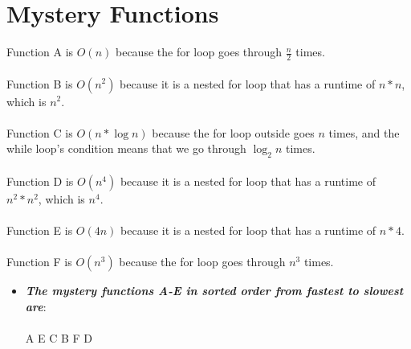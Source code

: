 \documentclass{article}
\begin{document}
    \vspace{1cm}
    \section{Mystery Functions}

    Function A is $O(n)$ because the for loop goes through $\frac{n}{2}$ times. \\ \\
    Function B is $O(n^2)$ because it is a nested for loop that has a runtime of $n*n$, which is $n^2$. \\ \\
    Function C is $O(n* \log n)$ because the for loop outside goes $n$ times, and the while loop's condition means that we go through $\log_{2} n$ times. \\ \\
    Function D is $O(n^4)$ because it is a nested for loop that has a runtime of $n^2*n^2$, which is $n^4$. \\ \\
    Function E is $O(4n)$ because it is a nested for loop that has a runtime of $n*4$. \\ \\
    Function F is $O(n^3)$ because the for loop goes through $n^3$ times. 
    
    \begin{itemize}
        \item \textbf{\textit{The mystery functions A-E in sorted order from fastest to slowest are}}: \\ \\
              A \; E \; C \; B \; F \; D
    \end{itemize}
\end{document}
